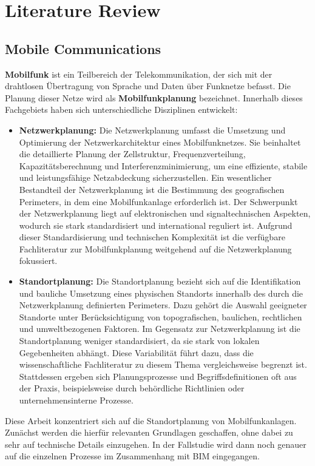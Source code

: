 \chapter{Literature Review}
\label{sec:literature_review}

\section{Mobile Communications}
\begin{German}
    \textbf{Mobilfunk} ist ein Teilbereich der Telekommunikation, der sich mit der drahtlosen Übertragung von Sprache und Daten über Funknetze befasst. Die Planung dieser Netze wird als \textbf{Mobilfunkplanung} bezeichnet. Innerhalb dieses Fachgebiets haben sich unterschiedliche Disziplinen entwickelt:

    \begin{itemize}
        \item \textbf{Netzwerkplanung:} Die Netzwerkplanung umfasst die Umsetzung und Optimierung der Netzwerkarchitektur eines Mobilfunknetzes. Sie beinhaltet die detaillierte Planung der Zellstruktur, Frequenzverteilung, Kapazitätsberechnung und Interferenzminimierung, um eine effiziente, stabile und leistungsfähige Netzabdeckung sicherzustellen. Ein wesentlicher Bestandteil der Netzwerkplanung ist die Bestimmung des geografischen Perimeters, in dem eine Mobilfunkanlage erforderlich ist.
        Der Schwerpunkt der Netzwerkplanung liegt auf elektronischen und signaltechnischen Aspekten, wodurch sie stark standardisiert und international reguliert ist. Aufgrund dieser Standardisierung und technischen Komplexität ist die verfügbare Fachliteratur zur Mobilfunkplanung weitgehend auf die Netzwerkplanung fokussiert.

        \item \textbf{Standortplanung:} Die Standortplanung bezieht sich auf die Identifikation und bauliche Umsetzung eines physischen Standorts innerhalb des durch die Netzwerkplanung definierten Perimeters. Dazu gehört die Auswahl geeigneter Standorte unter Berücksichtigung von topografischen, baulichen, rechtlichen und umweltbezogenen Faktoren.
        Im Gegensatz zur Netzwerkplanung ist die Standortplanung weniger standardisiert, da sie stark von lokalen Gegebenheiten abhängt. Diese Variabilität führt dazu, dass die wissenschaftliche Fachliteratur zu diesem Thema vergleichsweise begrenzt ist. Stattdessen ergeben sich Planungsprozesse und Begriffsdefinitionen oft aus der Praxis, beispielsweise durch behördliche Richtlinien oder unternehmensinterne Prozesse.
    \end{itemize}

    Diese Arbeit konzentriert sich auf die Standortplanung von Mobilfunkanlagen. Zunächst werden die hierfür relevanten Grundlagen geschaffen, ohne dabei zu sehr auf technische Details einzugehen. In der Fallstudie wird dann noch genauer auf die einzelnen Prozesse im Zusammenhang mit BIM eingegangen.
\end{German}

